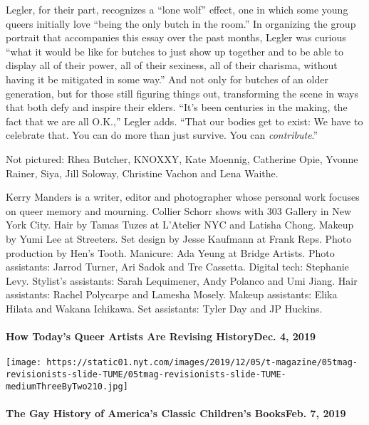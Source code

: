 Legler, for their part, recognizes a ``lone wolf'' effect, one in which
some young queers initially love ``being the only butch in the room.''
In organizing the group portrait that accompanies this essay over the
past months, Legler was curious ``what it would be like for butches to
just show up together and to be able to display all of their power, all
of their sexiness, all of their charisma, without having it be mitigated
in some way.'' And not only for butches of an older generation, but for
those still figuring things out, transforming the scene in ways that
both defy and inspire their elders. ``It's been centuries in the making,
the fact that we are all O.K.,'' Legler adds. ``That our bodies get to
exist: We have to celebrate that. You can do more than just survive. You
can \emph{contribute}.''

Not pictured: Rhea Butcher, KNOXXY, Kate Moennig, Catherine Opie, Yvonne
Rainer, Siya, Jill Soloway, Christine Vachon and Lena Waithe.

Kerry Manders is a writer, editor and photographer whose personal work
focuses on queer memory and mourning. Collier Schorr shows with 303
Gallery in New York City. Hair by Tamas Tuzes at L'Atelier NYC and
Latisha Chong. Makeup by Yumi Lee at Streeters. Set design by Jesse
Kaufmann at Frank Reps. Photo production by Hen's Tooth. Manicure: Ada
Yeung at Bridge Artists. Photo assistants: Jarrod Turner, Ari Sadok and
Tre Cassetta. Digital tech: Stephanie Levy. Stylist's assistants: Sarah
Lequimener, Andy Polanco and Umi Jiang. Hair assistants: Rachel
Polycarpe and Lamesha Mosely. Makeup assistants: Elika Hilata and Wakana
Ichikawa. Set assistants: Tyler Day and JP Huckins.

\href{https://www.nytimes.com/2019/12/04/t-magazine/gay-artwork-history.html}{}

\hypertarget{how-todays-queer-artists-are-revising-historydec-4-2019}{%
\paragraph{How Today's Queer Artists Are Revising HistoryDec. 4,
2019}\label{how-todays-queer-artists-are-revising-historydec-4-2019}}

\texttt{[image: https://static01.nyt.com/images/2019/12/05/t-magazine/05tmag-revisionists-slide-TUME/05tmag-revisionists-slide-TUME-mediumThreeByTwo210.jpg]}
\href{https://www.nytimes.com/2019/02/07/t-magazine/gay-children-book-authors.html}{}

\hypertarget{the-gay-history-of-americas-classic-childrens-booksfeb-7-2019}{%
\paragraph{The Gay History of America's Classic Children's BooksFeb. 7,
2019}\label{the-gay-history-of-americas-classic-childrens-booksfeb-7-2019}}

